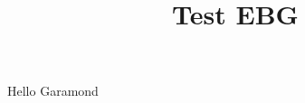 \documentclass[
]{article}
\title{Test EBG}
\author{}
\date{}
\begin{document}
\maketitle

Hello Garamond
\end{document}
